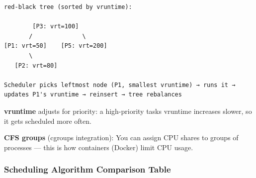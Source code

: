\documentclass[11pt]{article}
\begin{document}
\begin{verbatim}
red-black tree (sorted by vruntime):

        [P3: vrt=100]
       /              \
[P1: vrt=50]    [P5: vrt=200]
       \
   [P2: vrt=80]

Scheduler picks leftmost node (P1, smallest vruntime) → runs it → 
updates P1's vruntime → reinsert → tree rebalances
\end{verbatim}

\textbf{vruntime} adjusts for priority: a high-priority task\textquotesingle s vruntime increases slower, so it gets scheduled more often.

\textbf{CFS groups} (cgroups integration): You can assign CPU shares to groups of processes --- this is how containers (Docker) limit CPU usage.

\subsubsection{Scheduling Algorithm Comparison Table}\label{scheduling-algorithm-comparison-table}
\end{document}
